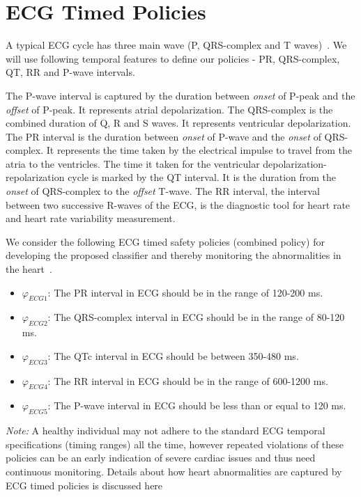 \section{ECG Timed Policies}
\label{sec:ecgPolicies}
A typical ECG cycle has three main wave (P, QRS-complex and T waves)~\cite{hampton2019ecg}. We will use following temporal features to define our policies - PR, QRS-complex, QT, RR and P-wave intervals.

The P-wave interval is captured by the duration between \emph{onset} of P-peak and the \emph{offset} of P-peak. It represents atrial depolarization. The QRS-complex is the combined duration of Q, R and S waves. It represents ventricular depolarization. The PR interval is the duration between \emph{onset} of P-wave and the \emph{onset} of QRS-complex. It represents the time taken by the electrical impulse to travel from the atria to the ventricles. The time it taken for the ventricular depolarization-repolarization cycle is marked by the QT interval. It is the duration from the \emph{onset} of QRS-complex to the \emph{offset} T-wave. The RR interval, the interval between two successive R-waves of the ECG, is the diagnostic tool for heart rate and heart rate variability measurement.

We consider the following ECG timed safety policies (combined policy) for
developing the proposed classifier and thereby monitoring the abnormalities in
the heart~\cite{hampton2019ecg}.

\begin{itemize}
	\item $\varphi_{ECG1}$: The PR interval in ECG should be in the range of 120-200 ms.
	
	\item $\varphi_{ECG2}$: The QRS-complex interval in ECG should be in the range of 80-120 ms.
	
	\item $\varphi_{ECG3}$: The QTc interval in ECG should be between 350-480 ms.
	
	\item $\varphi_{ECG4}$: The RR interval in ECG should be in the range of 600-1200 ms.
	
	\item $\varphi_{ECG5}$: The P-wave interval in ECG should be less than or equal to 120 ms.
	
\end{itemize}




	\textit{Note:} A healthy individual may not adhere to the standard ECG temporal specifications (timing ranges) all the time, however repeated violations of these policies can be an early indication of severe cardiac issues and thus need continuous monitoring. Details about how heart abnormalities are captured by ECG timed policies is discussed here~\cite{appendiz}	


